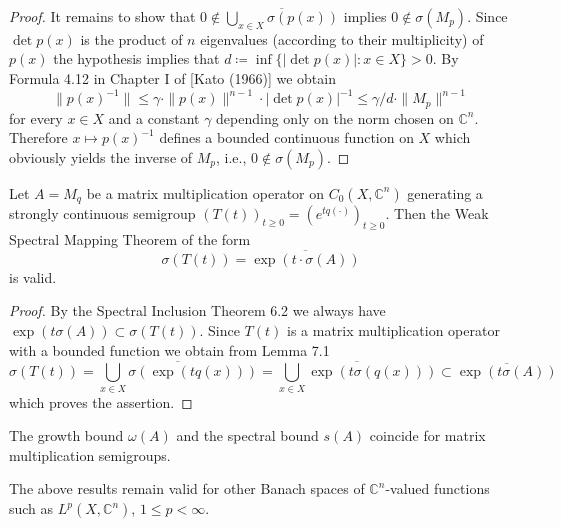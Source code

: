 \begin{proof}
	It remains to show that $0 \notin \overline{\bigcup_{x\in X} \sigma(p(x))}$ implies $0 \notin \sigma(M_{p})$.
	Since $\det p(x)$ is the product of $n$ eigenvalues (according to their multiplicity) of $p(x)$ the hypothesis implies that $d \coloneqq \inf\{|\det p(x)| \colon x \in X\} > 0$.
	By Formula 4.12 in Chapter I of [Kato (1966)] we obtain
	\[
	\|p(x)^{-1}\| \leq \gamma \cdot \|p(x)\|^{n-1} \cdot |\det p(x)|^{-1} \leq \gamma/d \cdot \|M_{p}\|^{n-1}
	\]
	for every $x \in X$ and a constant $\gamma$ depending only on the norm chosen on $\mathbb{C}^{n}$.
	Therefore $x \mapsto p(x)^{-1}$ defines a bounded continuous function on $X$ which obviously yields the inverse of $M_{p}$, i.e., $0 \notin \sigma(M_{p})$.
\end{proof}

\begin{theorem}\label{thm:a3-7.2}
	Let $A = M_{q}$ be a matrix multiplication operator on $C_{0}(X,\mathbb{C}^{n})$ generating a strongly continuous semigroup $(T(t))_{t\geq 0} = (e^{tq(\cdot)})_{t\geq 0}$.
	Then the Weak Spectral Mapping Theorem of the form
	\begin{equation}\label{eq:a3-7.2}
		\sigma(T(t)) = \overline{\exp(t\cdot\sigma(A))}
	\end{equation}
	is valid.
\end{theorem}

\begin{proof}
	By the Spectral Inclusion Theorem 6.2 we always have $\exp(t\sigma(A)) \subset \sigma(T(t))$.
	Since $T(t)$ is a matrix multiplication operator with a bounded function we obtain from Lemma 7.1
	\[
	\sigma(T(t)) = \overline{\bigcup_{x\in X} \sigma(\exp(tq(x)))} = \overline{\bigcup_{x\in X} \exp(t\sigma(q(x)))} \subset \overline{\exp(t\sigma(A))}
	\]
	which proves the assertion.
\end{proof}

\begin{corollary}\label{cor:a3-7.3}
	The growth bound $\omega(A)$ and the spectral bound $s(A)$ coincide for matrix multiplication semigroups.
\end{corollary}

\begin{remark}
	The above results remain valid for other Banach spaces of $\mathbb{C}^{n}$-valued functions such as $L^{p}(X,\mathbb{C}^{n})$, $1 \leq p < \infty$.
\end{remark}

